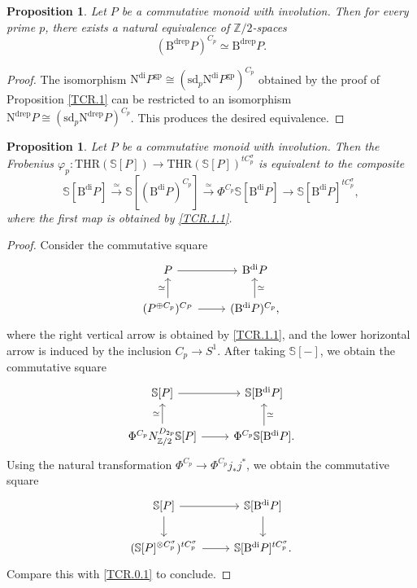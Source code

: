 \documentclass[10pt]{amsart}
\newtheorem{prop}[thm]{Proposition}
\theoremstyle{definition}
\theoremstyle{remark}
\numberwithin{equation}{section}
\newcommand{\Sphere}{\mathbb{S}}
\newcommand{\Z}{\mathbb{Z}}
\newcommand{\Bdi}{\mathrm{B}^{\mathrm{di}}}
\newcommand{\Bdrep}{\mathrm{B}^\mathrm{drep}}
\newcommand{\Ndrep}{\mathrm{N}^\mathrm{drep}}
\newcommand{\Ndi}{\mathrm{N}^\mathrm{di}}
\newcommand{\THR}{\mathrm{THR}}
\newcommand{\sd}{\mathrm{sd}}
\newcommand{\gp}{\mathrm{gp}}
\newcommand{\Ztwo}{{\mathbb{Z}/2}}
\begin{document}
\begin{prop}
\label{TCR.2}
Let $P$ be a commutative monoid with involution.
Then for every prime $p$,
there exists a natural equivalence of $\Z/2$-spaces
\begin{equation}
\label{TCR.2.1}
(\Bdrep P)^{C_p}
\simeq
\Bdrep P.
\end{equation}
\end{prop}
\begin{proof}
The isomorphism $\Ndi P^\gp \cong (\sd_p \Ndi P^\gp)^{C_p}$ obtained by the proof of Proposition \ref{TCR.1} can be restricted to an isomorphism $\Ndrep P \cong (\sd_p \Ndrep P)^{C_p}$.
This produces the desired equivalence.
\end{proof}

\begin{prop}
\label{TCR.3}
Let $P$ be a commutative monoid with involution.
Then the Frobenius $\varphi_p \colon \THR(\Sphere[P])\to \THR(\Sphere[P])^{tC_p^\sigma}$ is equivalent to the composite
\begin{equation}
\label{TCR.3.1}
\Sphere[\Bdi P]
\xrightarrow{\simeq}
\Sphere[(\Bdi P)^{C_p}]
\xrightarrow{\simeq}
\Phi^{C_p}\Sphere[\Bdi P]
\to
\Sphere[\Bdi P]^{tC_p^\sigma},
\end{equation}
where the first map is obtained by \eqref{TCR.1.1}.
\end{prop}
\begin{proof}
Consider the commutative square
\[
\begin{tikzcd}
P\ar[r]\ar[d,leftarrow,"\simeq"']&
\Bdi P\ar[d,leftarrow,"\simeq"]
\\
(P^{\oplus C_p})^{C_P}\ar[r]&
(\Bdi P)^{C_p},
\end{tikzcd}
\]
where the right vertical arrow is obtained by \eqref{TCR.1.1}, and the lower horizontal arrow is induced by the inclusion $C_p\to S^1$.
After taking $\Sphere[-]$,
we obtain the commutative square
\[
\begin{tikzcd}
\Sphere[P]\ar[d,leftarrow,"\simeq"']\ar[r]&
\Sphere[\Bdi P]\ar[d,leftarrow,"\simeq"]
\\
\Phi^{C_p} N_{\Ztwo}^{D_{2p}} \Sphere[P]\ar[r]&
\Phi^{C_p} \Sphere[\Bdi P].
\end{tikzcd}
\]
Using the natural transformation $\Phi^{C_p}\to \Phi^{C_p}j_*j^*$,
we obtain the commutative square
\[
\begin{tikzcd}
\Sphere[P]\ar[d]\ar[r]&
\Sphere[\Bdi P]\ar[d]
\\
(\Sphere[P]^{\otimes C_p^\sigma})^{tC_p^\sigma}\ar[r]&
\Sphere[\Bdi P]^{tC_p^\sigma}.
\end{tikzcd}
\]
Compare this with \eqref{TCR.0.1} to conclude.
\end{proof}
\end{document}
